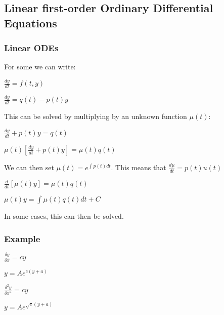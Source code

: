 
\subsection{Linear first-order Ordinary Differential Equations}

\subsubsection{Linear ODEs}

For some we can write:

\(\frac{dy}{dt}=f(t,y)\)

\(\frac{dy}{dt}=q(t)-p(t)y\)

This can be solved by multiplying by an unknown function \(\mu (t)\):

\(\frac{dy}{dt}+p(t)y=q(t)\)

\(\mu (t)[\frac{dy}{dt}+p(t)y]=\mu (t)q(t)\)

We can then set \(\mu(t)=e^{\int p(t)dt}\). This means that \(\frac{d\mu }{dt}=p(t)u(t)\)

\(\frac{d}{dt}[\mu(t)y]=\mu (t)q(t)\)

\(\mu(t)y=\int \mu (t)q(t)dt + C\)

In some cases, this can then be solved.

\subsubsection{Example}

\(\frac{\delta y}{\delta x}=cy\)

\(y=Ae^{c(y+a)}\)


\(\frac{\delta^2 y}{\delta x^2}=cy\)

\(y=Ae^{\sqrt c (y+a)}\)

